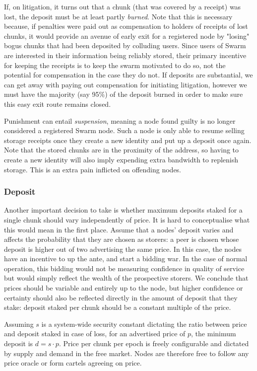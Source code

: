 If, on litigation, it turns out that a chunk (that was covered by a receipt) was lost, the deposit must be at least partly \emph{burned}. Note that this is necessary because, if penalties were paid out as compensation to holders of receipts of lost chunks, it would provide an avenue of early exit for a registered node by "losing" bogus chunks that had been deposited by colluding users. Since users of Swarm are interested in their information being reliably stored, their primary incentive for keeping the receipts is to keep the swarm motivated to do so, not the potential for compensation in the case they do not. If deposits are substantial, we can get away with paying out compensation for initiating litigation, however we must have the majority (say 95\%) of the deposit burned in order to make sure this easy exit route remains closed.

Punishment can entail \emph{suspension}, meaning a node found guilty is no longer considered a registered Swarm node. Such a node is only able to resume selling storage receipts once they create a new identity and put up a deposit once again. Note that the stored chunks are in the proximity of the address, so having to create a new identity will also imply expending extra bandwidth to replenish storage. This is an extra pain inflicted on offending nodes.


\subsubsection{Deposit}

Another important decision to take is whether maximum deposits staked for a single chunk should vary independently of price. It is hard to conceptualise what this would mean in the first place. Assume that a nodes' deposit varies and affects the probability that they are chosen as storers: a peer is chosen whose deposit is higher out of two advertising the same price. In this case, the nodes have an incentive to up the ante, and start a bidding war. In the case of normal operation, this bidding would not be measuring confidence in quality of service but would simply reflect the wealth of the prospective storers. We conclude that prices should be variable and entirely up to the node, but higher confidence or certainty should also be reflected directly in the amount of deposit that they stake: deposit staked per chunk should be a constant multiple of the price.

Assuming $s$ is a system-wide security constant dictating the ratio between price and deposit staked in case of loss, for an advertised price of $p$, the minimum deposit is $d=s\cdot p$. Price per chunk per epoch is freely configurable and dictated by supply and demand in the free market. Nodes are therefore free to follow any price oracle or form cartels agreeing on price.

